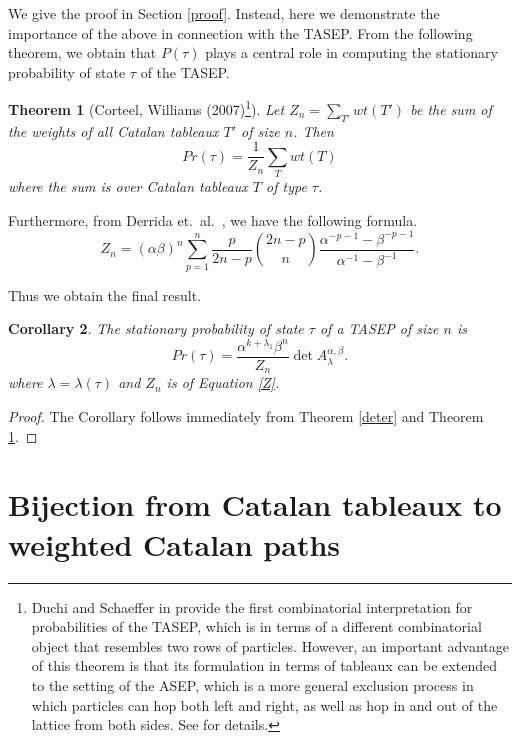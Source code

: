 \documentclass[11pt]{article}
\numberwithin{equation}{section}
\theoremstyle{plain}
\newtheorem{thm}{Theorem}[section]
\newtheorem{cor}[thm]{Corollary}
\theoremstyle{definition}
\theoremstyle{remark}
\begin{document}

We give the proof in Section \ref{proof}. Instead, here we demonstrate the importance of the above in connection with the TASEP. From the following theorem, we obtain that $P(\tau)$ plays a central role in computing the stationary probability of state $\tau$ of the TASEP.

\begin{thm}[Corteel, Williams (2007)\footnote{Duchi and Schaeffer in \cite{duchi}  provide the first combinatorial interpretation for probabilities of the TASEP, which is in terms of a different combinatorial object that resembles two rows of particles. However, an important advantage of this theorem is that its formulation in terms of tableaux can be extended to the setting of the ASEP, which is a more general exclusion process in which particles can hop both left and right, as well as hop in and out of the lattice from both sides. See \cite{williams2007,williams2011} for details.}] \label{cw}
Let $Z_n = \sum_{T'} wt(T')$ be the sum of the weights of all Catalan tableaux $T'$ of size $n$. Then
\begin{displaymath}
Pr(\tau) = \frac{1}{Z_n}\sum_T wt(T)
\end{displaymath}
where the sum is over Catalan tableaux $T$ of type $\tau$.
\end{thm}

Furthermore, from Derrida et.\ al.\ \cite{derrida}, we have the following formula.
\begin{equation}\label{Z}
Z_n = (\alpha\beta)^n \sum_{p=1}^n \frac{p}{2n-p} {2n-p \choose n} \frac{\alpha^{-p-1}-\beta^{-p-1}}{\alpha^{-1}-\beta^{-1}}.
\end{equation}


Thus we obtain the final result.

\begin{cor}
The stationary probability of state $\tau$ of a TASEP of size $n$ is
\[
Pr(\tau) = \frac{\alpha^{k+\lambda_1}\beta^n}{Z_n} \det A^{\alpha,\beta}_{\lambda}.
\]
where $\lambda=\lambda(\tau)$ and $Z_n$ is of Equation \ref{Z}.
\end{cor}

\begin{proof}
The Corollary follows immediately from Theorem \ref{deter} and Theorem \ref{cw}.
\end{proof}

\section{Bijection from Catalan tableaux to weighted Catalan paths}
\end{document}
